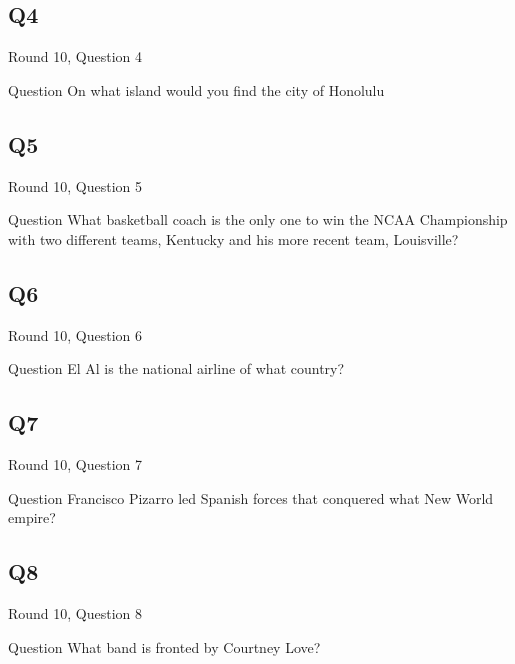 \documentclass[11pt]{beamer}
\begin{document}
\subsection*{Q4}
\begin{frame}[t]{Round 10, Question 4}
\vspace{2em}
\begin{block}{Question}
On what island would you find the city of Honolulu
\end{block}
\end{frame}
    

\subsection*{Q5}
\begin{frame}[t]{Round 10, Question 5}
\vspace{2em}
\begin{block}{Question}
What basketball coach is the only one to win the NCAA Championship with two different teams, Kentucky and his more recent team, Louisville\@?
\end{block}
\end{frame}
    

\subsection*{Q6}
\begin{frame}[t]{Round 10, Question 6}
\vspace{2em}
\begin{block}{Question}
El Al is the national airline of what country\@?
\end{block}
\end{frame}
    

\subsection*{Q7}
\begin{frame}[t]{Round 10, Question 7}
\vspace{2em}
\begin{block}{Question}
Francisco Pizarro led Spanish forces that conquered what New World empire\@?
\end{block}
\end{frame}
    

\subsection*{Q8}
\begin{frame}[t]{Round 10, Question 8}
\vspace{2em}
\begin{block}{Question}
What band is fronted by Courtney Love\@?
\end{block}
\end{frame}
    
\end{document}
